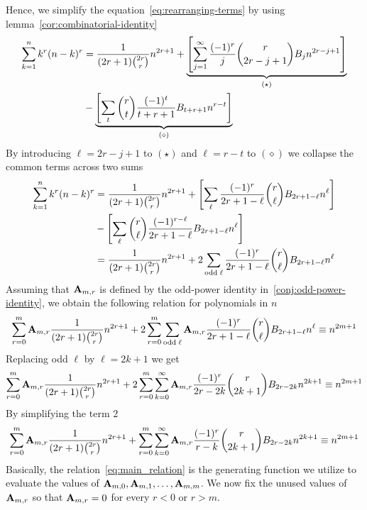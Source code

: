 Hence, we simplify the equation~\eqref{eq:rearranging-terms} by using lemma~\eqref{cor:combinatorial-identity}
\begin{equation*}
    \begin{split}
        \sum_{k=1}^{n} k^{r} (n-k)^{r}
        &= \frac{1}{(2r+1) \binom{2r}r} n^{2r+1}
        + \underbrace{\left[ \sum_{j = 1}^{\infty} \frac{(-1)^r}{j} \binom{r}{2r-j+1} {B}\sb{j} n^{2r-j+1} \right]}_{(\star)} \\
        &- \underbrace{\left[ \sum_{t} \binom{r}{t} \frac{(-1)^t}{t+r+1} {B}\sb{t+r+1} n^{r-t} \right]}_{(\diamond)}
    \end{split}
\end{equation*}
By introducing $\ell=2r-j+1$ to $(\star)$ and $\ell=r-t$ to $(\diamond)$
we collapse the common terms across two sums
\begin{equation*}
    \begin{split}
        \sum_{k=1}^{n} k^{r} (n-k)^{r}
        &= \frac{1}{(2r+1) \binom{2r}r} n^{2r+1}
        + \left[ \sum_{\ell} \frac{(-1)^r}{2r+1-\ell} \binom{r}{\ell} {B}\sb{2r+1-\ell} n^{\ell} \right] \\
        &- \left[ \sum_{\ell} \binom{r}{\ell} \frac{(-1)^{r-\ell}}{2r+1-\ell} {B}\sb{2r+1-\ell} n^{\ell} \right]\\
        &= \frac{1}{(2r+1) \binom{2r}r} n^{2r+1} + 2 \sum_{\mathrm{odd \; \ell}} \frac{(-1)^r}{2r+1-\ell} \binom{r}{\ell} {B}\sb{2r+1-\ell} n^{\ell}
    \end{split}
\end{equation*}
Assuming that ${\mathbf{A}} \sb{m,r}$ is defined by the odd-power identity in~\eqref{conj:odd-power-identity},
we obtain the following relation for polynomials in $n$
\begin{equation*}
    \sum_{r=0}^{m} {\mathbf{A}} \sb{m,r} \frac{1}{(2r+1) \binom{2r}r} n^{2r+1}
    + 2 \sum_{r=0}^{m} \sum_{\mathrm{odd \; \ell}} {\mathbf{A}} \sb{m,r} \frac{(-1)^r}{2r+1-\ell} \binom{r}{\ell} {B}\sb{2r+1-\ell} n^{\ell}
    \equiv n^{2m+1}
\end{equation*}
Replacing odd $\ell$ by $\ell = 2k+1$ we get
\begin{align*}
    \sum_{r=0}^{m} {\mathbf{A}} \sb{m,r} \frac{1}{(2r+1) \binom{2r}{r}} n^{2r+1} + 2 \sum_{r=0}^{m} \sum_{k=0}^{\infty} {\mathbf{A}} \sb{m,r} \frac{(-1)^r}{2r-2k} \binom{r}{2k+1} {B}\sb{2r-2k} n^{2k+1}  \equiv n^{2m+1}
\end{align*}
By simplifying the term $2$
\begin{align}
    \label{eq:main_relation}
    \sum_{r=0}^{m} {\mathbf{A}} \sb{m,r} \frac{1}{(2r+1) \binom{2r}{r}} n^{2r+1} + \sum_{r=0}^{m} \sum_{k=0}^{\infty} {\mathbf{A}} \sb{m,r} \frac{(-1)^r}{r-k} \binom{r}{2k+1} {B}\sb{2r-2k} n^{2k+1}  \equiv n^{2m+1}
\end{align}
Basically, the relation~\eqref{eq:main_relation} is the generating function we utilize to
evaluate the values of ${\mathbf{A}} \sb{m,0}, {\mathbf{A}} \sb{m,1}, \ldots, {\mathbf{A}} \sb{m,m}$.
We now fix the unused values of ${\mathbf{A}} \sb{m,r}$ so that ${\mathbf{A}} \sb{m,r} = 0$ for every $r < 0$ or $r > m$.

